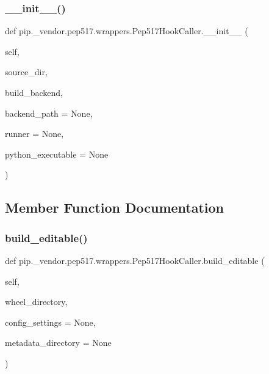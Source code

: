 \subsubsection{\texorpdfstring{\+\_\+\+\_\+init\+\_\+\+\_\+()}{\_\_init\_\_()}}
{\footnotesize\ttfamily def pip.\+\_\+vendor.\+pep517.\+wrappers.\+Pep517\+Hook\+Caller.\+\_\+\+\_\+init\+\_\+\+\_\+ (\begin{DoxyParamCaption}\item[{}]{self,  }\item[{}]{source\+\_\+dir,  }\item[{}]{build\+\_\+backend,  }\item[{}]{backend\+\_\+path = {\ttfamily None},  }\item[{}]{runner = {\ttfamily None},  }\item[{}]{python\+\_\+executable = {\ttfamily None} }\end{DoxyParamCaption})}



\subsection{Member Function Documentation}
\mbox{\label{classpip_1_1__vendor_1_1pep517_1_1wrappers_1_1Pep517HookCaller_a666eaf0a756b3380193153877c1dae77}} 
\subsubsection{\texorpdfstring{build\+\_\+editable()}{build\_editable()}}
{\footnotesize\ttfamily def pip.\+\_\+vendor.\+pep517.\+wrappers.\+Pep517\+Hook\+Caller.\+build\+\_\+editable (\begin{DoxyParamCaption}\item[{}]{self,  }\item[{}]{wheel\+\_\+directory,  }\item[{}]{config\+\_\+settings = {\ttfamily None},  }\item[{}]{metadata\+\_\+directory = {\ttfamily None} }\end{DoxyParamCaption})}

